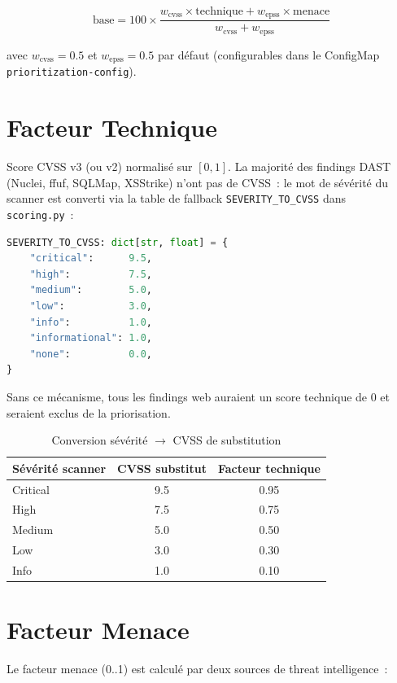 \documentclass[12pt,a4paper]{report}
\begin{document}
\begin{equation}
\text{base} = 100 \times \frac{w_{\text{cvss}} \times \text{technique} + w_{\text{epss}} \times \text{menace}}{w_{\text{cvss}} + w_{\text{epss}}}
\label{eq:base}
\end{equation}

avec $w_{\text{cvss}} = 0.5$ et $w_{\text{epss}} = 0.5$ par défaut (configurables dans le ConfigMap \texttt{prioritization-config}).

\section{Facteur Technique}
Score CVSS v3 (ou v2) normalisé sur $[0, 1]$. La majorité des findings DAST (Nuclei, ffuf, SQLMap, XSStrike) n'ont pas de CVSS~: le mot de sévérité du scanner est converti via la table de fallback \texttt{SEVERITY\_TO\_CVSS} dans \texttt{scoring.py}~:

\begin{lstlisting}[language=python, caption={Table de fallback sévérité → CVSS (scoring.py)}, label={lst:severity_cvss}]
SEVERITY_TO_CVSS: dict[str, float] = {
    "critical":      9.5,
    "high":          7.5,
    "medium":        5.0,
    "low":           3.0,
    "info":          1.0,
    "informational": 1.0,
    "none":          0.0,
}
\end{lstlisting}

Sans ce mécanisme, tous les findings web auraient un score technique de 0 et seraient exclus de la priorisation.

\begin{table}[H]
\centering
\caption{Conversion sévérité $\rightarrow$ CVSS de substitution}
\small
\begin{tabular}{l c c}
\toprule
\textbf{Sévérité scanner} & \textbf{CVSS substitut} & \textbf{Facteur technique} \\
\midrule
Critical & 9.5 & 0.95 \\
High     & 7.5 & 0.75 \\
Medium   & 5.0 & 0.50 \\
Low      & 3.0 & 0.30 \\
Info     & 1.0 & 0.10 \\
\bottomrule
\end{tabular}
\end{table}

\section{Facteur Menace}
Le facteur menace (0..1) est calculé par deux sources de threat intelligence~:
\end{document}
